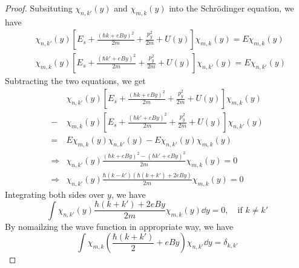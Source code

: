 \documentclass[11pt,a4paper]{article}
\theoremstyle{plain}
\theoremstyle{definition}
\theoremstyle{remark}
\begin{document}
\begin{proof}
    Subsituting $\chi_{n,k'}(y)$ and $\chi_{m,k}(y)$ into the Schrödinger equation, we have
    \begin{equation*}
        \begin{aligned}
            & \chi_{n,k'}(y) \left[ E_s + \frac{(\hbar k + eBy)^2}{2 m} + \frac{p_y^2}{2m} + U(y) \right] \chi_{m,k}(y) = E\chi_{m,k}(y) \\
            & \chi_{m,k}(y) \left[ E_s + \frac{(\hbar k' + eBy)^2}{2 m} + \frac{p_y^2}{2m} + U(y) \right] \chi_{n,k'}(y) = E\chi_{n,k'}(y)
        \end{aligned}
    \end{equation*}
    Subtracting the two equations, we get
    \begin{equation*}
        \begin{aligned}
            & \chi_{n,k'}(y) \left[ E_s + \frac{(\hbar k + eBy)^2}{2 m} + \frac{p_y^2}{2m} + U(y) \right] \chi_{m,k}(y) \\
            - &\chi_{m,k}(y) \left[ E_s + \frac{(\hbar k' + eBy)^2}{2 m} + \frac{p_y^2}{2m} + U(y) \right] \chi_{n,k'}(y) \\
            = & E\chi_{m,k}(y)\chi_{n,k'}(y) - E\chi_{n,k'}(y)\chi_{m,k}(y) \\
            \Rightarrow & \chi_{n,k'}(y) \frac{(\hbar k + eBy)^2-(\hbar k' + eBy)^2}{2 m} \chi_{m,k}(y) = 0 \\
            \Rightarrow & \chi_{n,k'}(y) \frac{\hbar(k-k')(\hbar(k+k') + 2eBy)}{2 m} \chi_{m,k}(y) = 0
        \end{aligned}
    \end{equation*}
    Integrating both sides over $y$, we have
    \begin{equation*}
        \int \chi_{n,k'}(y) \frac{\hbar(k+k') + 2eBy}{2 m} \chi_{m,k}(y) \dd y = 0, \quad \text{if } k \neq k'
    \end{equation*}
    By nomailzing the wave function in appropriate way, we have
    \begin{equation*}
        \int \chi_{m,k} \left( \frac{\hbar(k+k')}{2} + eBy \right) \chi_{n,k'} \dd y = \delta_{k,k'}
    \end{equation*}
\end{proof}
\end{document}
